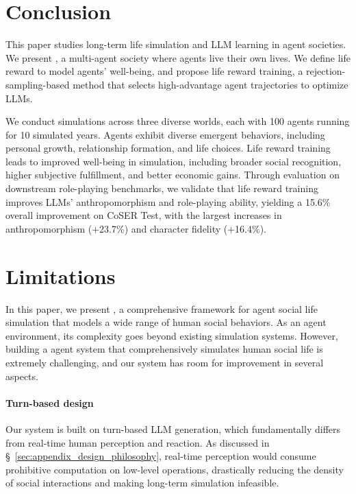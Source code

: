 
\section{Conclusion}
\label{sec:conclusion}

This paper studies long-term life simulation and LLM learning in agent societies. 
We present \method, a multi-agent society where agents live their own lives.
We define life reward to model agents' well-being, and propose life reward training, a rejection-sampling-based method that selects high-advantage agent trajectories to optimize LLMs.

We conduct simulations across three diverse worlds, each with 100 agents running for 10 simulated years.
Agents exhibit diverse emergent behaviors, including personal growth, relationship formation, and life choices.
Life reward training leads to improved well-being in simulation, including broader social recognition, higher subjective fulfillment, and better economic gains.
Through evaluation on downstream role-playing benchmarks, we validate that life reward training improves LLMs' anthropomorphism and role-playing ability, yielding a 15.6\% overall improvement on CoSER Test, with the largest increases in anthropomorphism (+23.7\%) and character fidelity (+16.4\%).

\section*{Limitations}

In this paper, we present \method, a comprehensive framework for agent social life simulation that models a wide range of human social behaviors.
As an agent environment, its complexity goes beyond existing simulation systems.
However, building a agent system that comprehensively simulates human social life is extremely challenging, and our system has room for improvement in several aspects.

\paragraph{Turn-based design}
Our system is built on turn-based LLM generation, which fundamentally differs from real-time human perception and reaction.
As discussed in \S~\ref{sec:appendix_design_philosophy}, real-time perception would consume prohibitive computation on low-level operations, drastically reducing the density of social interactions and making long-term simulation infeasible.

